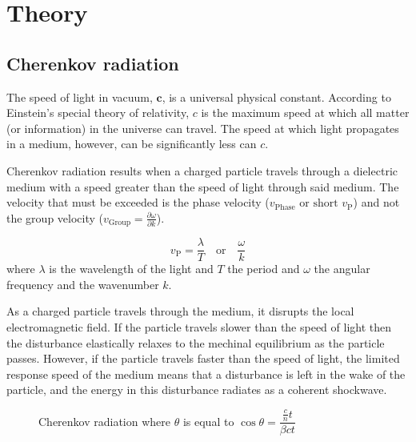 \documentclass[11pt,twoside]{scrreprt}
\begin{document}

\chapter{Theory}

\section{Cherenkov radiation} %
\label{sec:cherenkov_radiation}

The speed of light in vacuum, \( \mathbf{c} \), is a universal physical constant. According to Einstein's special theory of relativity, 
\( c \) is the maximum speed at which all matter (or information) in the universe can travel. The speed at which light propagates in a 
medium, however, can be significantly less can \( c \).

Cherenkov radiation results when a charged particle travels through a dielectric medium with a speed greater than the speed of light 
through said medium. The velocity that must be exceeded is the phase velocity (\( v_{\text{Phase}} \text{ or short } v_{\text{P}} \)) 
and not the group velocity (\( v_{\text{Group}} = \frac{\partial \omega}{\partial k} \)).

\[ v_{\text{P}} = \frac{\lambda}{T} \quad \text{or} \quad \frac{\omega}{k}\]
where $\lambda$ is the wavelength of the light and $T$ the period and $\omega$ the angular frequency and 
the wavenumber $k$.

As a charged particle travels through the medium, it disrupts the local electromagnetic field. If the particle travels slower than
the speed of light then the disturbance elastically relaxes to the mechinal equilibrium as the particle passes. However, if the particle 
travels faster than the speed of light, the limited response speed of the medium means that a disturbance is left in the wake of the 
particle, and the energy in this disturbance radiates as a coherent shockwave.

\begin{figure}[htbp]
  \centering
  \caption{Cherenkov radiation where $\theta$ is equal to $\cos\theta = \dfrac{\frac{c}{n}t}{\beta ct}$}
  \label{fig:label}
\end{figure}
\end{document}
